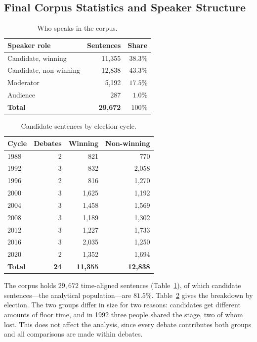 \documentclass[pdflatex,sn-mathphys-num]{sn-jnl}%
\begin{document}
\subsection{Final Corpus Statistics and Speaker Structure}
\label{sec:data:stats}

\begin{table}[t]
\caption{Who speaks in the corpus.}
\label{tab:roles}
\centering
\begin{tabular}{lrr}
\toprule
Speaker role           & Sentences & Share \\
\midrule
Candidate, winning     & 11{,}355 & $38.3\%$ \\
Candidate, non-winning & 12{,}838 & $43.3\%$ \\
Moderator              & 5{,}192  & $17.5\%$ \\
Audience               & 287      & $1.0\%$ \\
\midrule
\textbf{Total}         & \textbf{29{,}672} & $100\%$ \\
\bottomrule
\end{tabular}
\end{table}

\begin{table}[t]
\caption{Candidate sentences by election cycle.}
\label{tab:corpus}
\centering
\begin{tabular}{lrrr}
\toprule
Cycle & Debates & Winning & Non-winning \\
\midrule
1988 & 2 & 821    & 770    \\
1992 & 3 & 832    & 2{,}058 \\
1996 & 2 & 816    & 1{,}270 \\
2000 & 3 & 1{,}625 & 1{,}192 \\
2004 & 3 & 1{,}458 & 1{,}569 \\
2008 & 3 & 1{,}189 & 1{,}302 \\
2012 & 3 & 1{,}227 & 1{,}733 \\
2016 & 3 & 2{,}035 & 1{,}250 \\
2020 & 2 & 1{,}352 & 1{,}694 \\
\midrule
\textbf{Total} & \textbf{24} & \textbf{11{,}355} & \textbf{12{,}838} \\
\bottomrule
\end{tabular}
\end{table}

The corpus holds $29{,}672$ time-aligned sentences (Table~\ref{tab:roles}), of
which candidate sentences---the analytical population---are $81.5\%$.
Table~\ref{tab:corpus} gives the breakdown by election. The two groups differ
in size for two reasons: candidates get different amounts of floor time, and
in 1992 three people shared the stage, two of whom lost. This does not affect the
analysis, since every debate contributes both groups and all comparisons are
made within debates.
\end{document}
